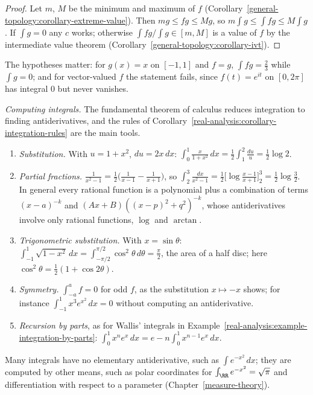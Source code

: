\begin{proof}
Let $m$, $M$ be the minimum and maximum of $f$ (Corollary~\ref{general-topology:corollary-extreme-value}). Then $mg \leq fg \leq Mg$, so $m\int g \leq \int fg \leq M\int g$. If $\int g = 0$ any $c$ works;
otherwise $\int fg/\int g \in [m, M]$ is a value of $f$ by the intermediate value theorem (Corollary~\ref{general-topology:corollary-ivt}).
\end{proof}

The hypotheses matter: for $g(x) = x$ on $[-1, 1]$ and $f = g$, $\int fg = \frac23$ while $\int g = 0$; and for vector-valued $f$ the statement fails, since $f(t) = e^{it}$ on $[0, 2\pi]$ has integral $0$
but never vanishes.

\begin{example}\label{real-analysis:example-computing-integrals}
\emph{Computing integrals.} The fundamental theorem of calculus reduces integration to finding antiderivatives, and the rules of Corollary~\ref{real-analysis:corollary-integration-rules} are the
main tools.
\begin{enumerate}
\item \emph{Substitution.} With $u = 1 + x^2$, $du = 2x\,dx$: $\int_0^1\frac{x}{1 + x^2}\,dx = \frac12\int_1^2\frac{du}{u} = \frac12\log 2$.
\item \emph{Partial fractions.} $\frac{1}{x^2 - 1} = \frac12\bigl(\frac{1}{x - 1} - \frac{1}{x + 1}\bigr)$, so $\int_2^3\frac{dx}{x^2 - 1} = \frac12\bigl[\log\frac{x - 1}{x + 1}\bigr]_2^3 = \frac12\log\frac32$.
In general every rational function is a polynomial plus a combination of terms $(x - a)^{-k}$ and $(Ax + B)((x - p)^2 + q^2)^{-k}$, whose antiderivatives involve only rational functions,
$\log$ and $\arctan$.
\item \emph{Trigonometric substitution.} With $x = \sin\theta$: $\int_{-1}^1\sqrt{1 - x^2}\,dx = \int_{-\pi/2}^{\pi/2}\cos^2\theta\,d\theta = \frac\pi2$, the area of a half disc; here
$\cos^2\theta = \frac12(1 + \cos 2\theta)$.
\item \emph{Symmetry.} $\int_{-a}^af = 0$ for odd $f$, as the substitution $x \mapsto -x$ shows; for instance $\int_{-1}^1x^3e^{x^2}\,dx = 0$ without computing an antiderivative.
\item \emph{Recursion by parts}, as for Wallis' integrals in Example~\ref{real-analysis:example-integration-by-parts}: $\int_0^1x^ne^x\,dx = e - n\int_0^1x^{n-1}e^x\,dx$.
\end{enumerate}
Many integrals have no elementary antiderivative, such as $\int e^{-x^2}\,dx$; they are computed by other means, such as polar coordinates for $\int_\RR e^{-x^2} = \sqrt\pi$ and differentiation with
respect to a parameter (Chapter~\ref{measure-theory}).
\end{example}

